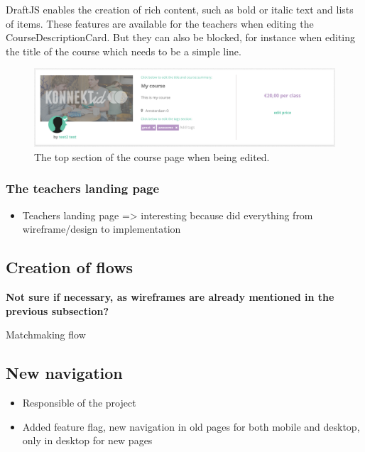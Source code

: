 DraftJS enables the creation of rich content, such as bold or italic text and lists of items. These features are available for the teachers when editing the
CourseDescriptionCard. But they can also be blocked, for instance when editing the title of the course which needs to be a simple line.

\begin{figure}[H]
    \centering
    \includegraphics[scale=0.2]{figure/courseEditIntro.png}
    \caption{The top section of the course page when being edited.}
    \label{fig:courseEditIntro}
\end{figure}

\subsubsection{The teachers landing page}
\label{sssec:teachersPage}

\begin{itemize}
    \item Teachers landing page => interesting because did everything from wireframe/design to implementation
\end{itemize}

\subsection{Creation of flows}
\label{ssec:flows}

\textbf{Not sure if necessary, as wireframes are already mentioned in the previous subsection?}

Matchmaking flow

\subsection{New navigation}
\label{ssec:new_nav}

\begin{itemize}
    \item Responsible of the project
    \item Added feature flag, new navigation in old pages for both mobile and desktop, only in desktop for new pages
\end{itemize}

